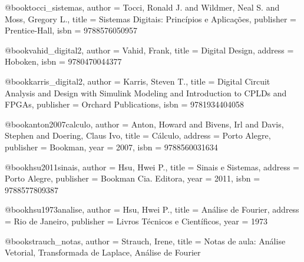 @book{tocci_sistemas,
  author = {Tocci, Ronald J. and Wildmer, Neal S. and Moss, Gregory L.},
  title = {Sistemas Digitais: Princípios e Aplicações},
  publisher = {Prentice-Hall},
  isbn = {9788576050957}%
}

@book{vahid_digital2,
  author = {Vahid, Frank},
  title = {Digital Design},
  address = {Hoboken},
  isbn = {9780470044377}
}

@book{karris_digital2,
  author = {Karris, Steven T.},
  title = {Digital Circuit Analysis and Design with Simulink Modeling and Introduction to CPLDs and FPGAs},
  publisher = {Orchard Publications},
  isbn = {9781934404058}
}

%

@book{anton2007calculo,
  author = {Anton, Howard and Bivens, Irl and Davis, Stephen and Doering, Claus Ivo},
  title = {Cálculo},
  address = {Porto Alegre},
  publisher = {Bookman},
  year = {2007},
  isbn = {9788560031634}%
}

@book{hsu2011sinais,
  author = {Hsu, Hwei P.},
  title = {Sinais e Sistemas},
  address = {Porto Alegre},
  publisher = {Bookman Cia. Editora},
  year = {2011},
  isbn = {9788577809387}
}

@book{hsu1973analise,
  author = {Hsu, Hwei P.},
  title = {Análise de Fourier},
  address = {Rio de Janeiro},
  publisher = {Livros Técnicos e Científicos},
  year = {1973}
}

@book{strauch_notas,
  author = {Strauch, Irene},
  title = {Notas de aula: Análise Vetorial, Transformada de Laplace, Análise de Fourier}
}

